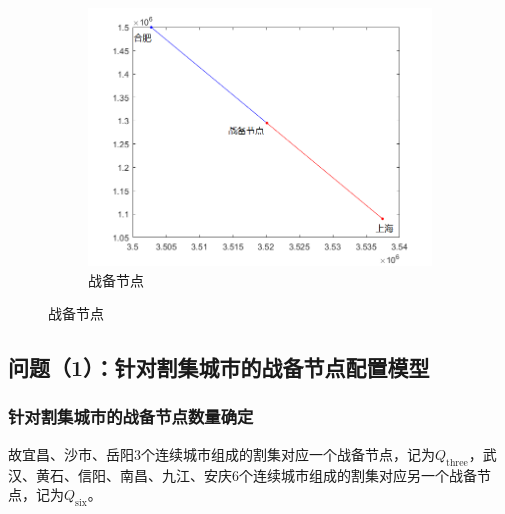 \documentclass{article}
\begin{document}
\begin{figure}[htpb]
\begin{subfigure}[htpb]{.31\linewidth}
		\centering
		\includegraphics[width=\linewidth]{231.png}
		\caption{战备节点}
		\label{fig:战备节点\chinese{subfigure}\arabic{subsection}}
	\end{subfigure}
	\caption{战备节点}
	\label{fig:战备节点\arabic{subsection}}
\end{figure}

\newpage

\subsection{问题（1）：针对割集城市的战备节点配置模型}%
\label{sub:\chinese{subsection}（1）：针对割集城市的战备节点配置模型}

\subsubsection{针对割集城市的战备节点数量确定}
\label{针对割集城市的战备节点数量确定}

故宜昌、沙市、岳阳3个连续城市组成的割集对应一个战备节点，记为$Q_\mathrm{three}$，武汉、黄石、信阳、南昌、九江、安庆6个连续城市组成的割集对应另一个战备节点，记为$Q_\text{six}$。
\end{document}
